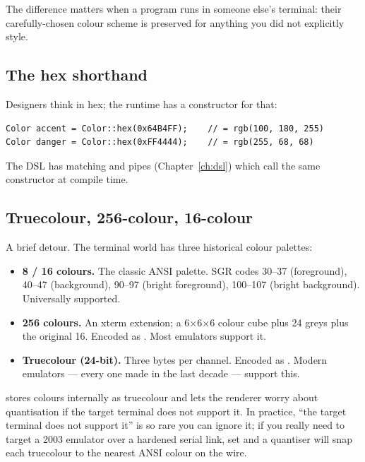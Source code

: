 The difference matters when a \maya{} program runs in someone
else's terminal: their carefully-chosen colour scheme is preserved
for anything you did not explicitly style.

\subsection{The hex shorthand}

Designers think in hex; the runtime has a constructor for that:

\begin{lstlisting}
Color accent = Color::hex(0x64B4FF);    // = rgb(100, 180, 255)
Color danger = Color::hex(0xFF4444);    // = rgb(255, 68, 68)
\end{lstlisting}

The DSL has matching  and 
pipes (Chapter~\ref{ch:dsl}) which call the same constructor at
compile time.

\subsection{Truecolour, 256-colour, 16-colour}

A brief detour. The terminal world has three historical colour
palettes:

\begin{itemize}[leftmargin=*]
  \item \textbf{8 / 16 colours.} The classic ANSI palette. SGR codes
    30--37 (foreground), 40--47 (background), 90--97 (bright
    foreground), 100--107 (bright background). Universally
    supported.
  \item \textbf{256 colours.} An xterm extension; a 6×6×6 colour
    cube plus 24 greys plus the original 16. Encoded as
    \code{ESC[38;5;<n>m}. Most emulators support it.
  \item \textbf{Truecolour (24-bit).} Three bytes per channel.
    Encoded as \code{ESC[38;2;<R>;<G>;<B>m}. Modern emulators ---
    every one made in the last decade --- support this.
\end{itemize}

\maya{} stores colours internally as truecolour and lets the
renderer worry about quantisation if the target terminal does not
support it. In practice, ``the target terminal does not support
it'' is so rare you can ignore it; if you really need to target a
2003 emulator over a hardened serial link, set
 and a quantiser
will snap each truecolour to the nearest ANSI colour on the wire.

